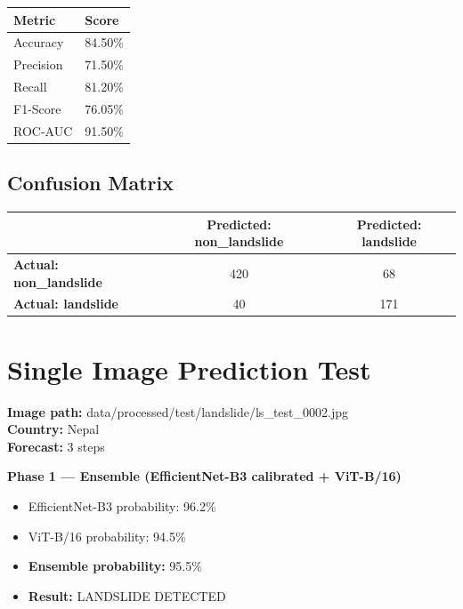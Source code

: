 \documentclass[11pt]{article}
\begin{document}
\vspace{0.3cm}
\begin{table}[h]
    \centering
    \begin{tabular}{@{}ll@{}}
        \toprule
        \textbf{Metric} & \textbf{Score} \\ \midrule
        Accuracy & 84.50\% \\
        Precision & 71.50\% \\
        Recall & 81.20\% \\
        F1-Score & 76.05\% \\
        ROC-AUC & 91.50\% \\ \bottomrule
    \end{tabular}
\end{table}

\subsection{Confusion Matrix}
\begin{table}[h]
    \centering
    \begin{tabular}{@{}lcc@{}}
        \toprule
        & \textbf{Predicted: non\_landslide} & \textbf{Predicted: landslide} \\ \midrule
        \textbf{Actual: non\_landslide} & 420 & 68 \\
        \textbf{Actual: landslide} & 40 & 171 \\ \bottomrule
    \end{tabular}
\end{table}

\section{Single Image Prediction Test}

\noindent \textbf{Image path:} data/processed/test/landslide/ls\_test\_0002.jpg \\
\textbf{Country:} Nepal \\
\textbf{Forecast:} 3 steps

\vspace{0.3cm}
\noindent \textbf{Phase 1 — Ensemble (EfficientNet-B3 calibrated + ViT-B/16)}
\begin{itemize}[noitemsep]
    \item EfficientNet-B3 probability: 96.2\%
    \item ViT-B/16 probability: 94.5\%
    \item \textbf{Ensemble probability:} 95.5\%
    \item \textbf{Result:} LANDSLIDE DETECTED
\end{itemize}
\end{document}
